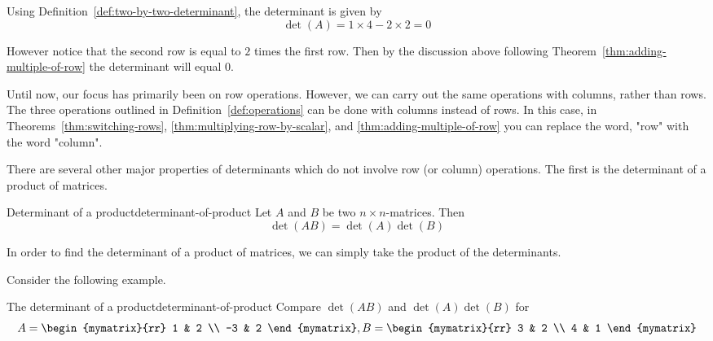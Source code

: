 \begin{solution}
  Using Definition~\ref{def:two-by-two-determinant}, the determinant
  is given by
  \begin{equation*}
    \det (A) = 1 \times 4 - 2 \times 2 = 0
  \end{equation*}

  However notice that the second row is equal to $2$ times the first
  row. Then by the discussion above following
  Theorem~\ref{thm:adding-multiple-of-row} the determinant will equal
  $0$.
\end{solution}

Until now, our focus has primarily been on row operations. However, we
can carry out the same operations with columns, rather than rows. The
three operations outlined in Definition~\ref{def:operations} can be
done with columns instead of rows.  In this case, in
Theorems~\ref{thm:switching-rows},
{\ref{thm:multiplying-row-by-scalar}}, and
{\ref{thm:adding-multiple-of-row}} you can replace the word, "row"
with the word "column".

There are several other major properties of determinants which do not
involve row (or column) operations. The first is the determinant of a
product of matrices.

\begin{theorem}{Determinant of a product}{determinant-of-product}
  Let $A$ and $B$ be two $n\times n$-matrices. Then
  \begin{equation*}
    \det (AB) =\det (A) \det (B)
  \end{equation*}
\end{theorem}

In order to find the determinant of a product of matrices, we can
simply take the product of the determinants.

Consider the following example.

\begin{example}{The determinant of a product}{determinant-of-product}
  Compare $\det (AB) $ and $\det (A) \det (
  B) $ for
  \begin{equation*}
    A=\begin{mymatrix}{rr}
      1 & 2 \\
      -3 & 2
    \end{mymatrix} ,B=\begin{mymatrix}{rr}
      3 & 2 \\
      4 & 1
    \end{mymatrix} 
  \end{equation*}
\end{example}

